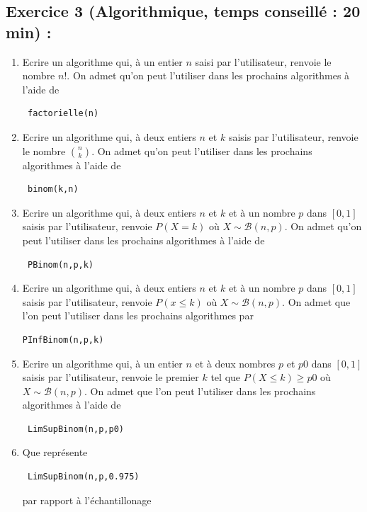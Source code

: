 \subsection*{Exercice 3 (Algorithmique, temps conseillé : 20 min) : }
\begin{enumerate}
\item Ecrire un algorithme qui, à un entier $n$ saisi par l'utilisateur, renvoie le nombre $n!$. On admet qu'on peut l'utiliser dans les prochains algorithmes à l'aide de \begin{verbatim} factorielle(n) \end{verbatim}
\item Ecrire un algorithme qui, à deux entiers $n$ et $k$ saisis par l'utilisateur, renvoie le nombre $\binom{n}{k}$. On admet qu'on peut l'utiliser dans les prochains algorithmes à l'aide de \begin{verbatim} binom(k,n) \end{verbatim}
\item Ecrire un algorithme qui, à deux entiers $n$ et $k$ et à un nombre $p$ dans $[0,1]$ saisis par l'utilisateur, renvoie $P(X=k)$ où $X\sim \mathscr{B}(n,p)$. On admet qu'on peut l'utiliser dans les prochains algorithmes à l'aide de \begin{verbatim} PBinom(n,p,k) \end{verbatim}
\item Ecrire un algorithme qui, à deux entiers $n$ et $k$ et à un nombre $p$ dans $[0,1]$ saisis par l'utilisateur, renvoie $P(x\leq k)$ où $X \sim \mathscr{B}(n,p)$. On admet que l'on peut l'utiliser dans les prochains algorithmes par \begin{verbatim}PInfBinom(n,p,k)\end{verbatim}
\item Ecrire un algorithme qui, à un entier $n$ et à deux nombres $p$ et $p0$ dans $[0,1]$ saisis par l'utilisateur, renvoie le premier $k$ tel que $P(X \leq k) \geq p0$ où $X\sim \mathscr{B}(n,p)$. On admet que l'on peut l'utiliser dans les prochains algorithmes à l'aide de \begin{verbatim} LimSupBinom(n,p,p0) \end{verbatim}
\item Que représente \begin{verbatim} LimSupBinom(n,p,0.975) \end{verbatim} par rapport à l'échantillonage
\end{enumerate}
